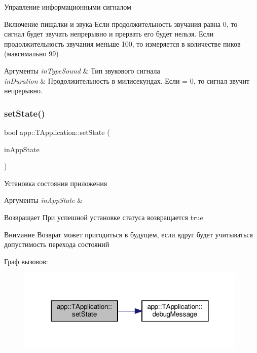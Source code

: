 Управление информационными сигналом 

Включение пищалки и звука Если продолжительность звучания равна 0, то сигнал будет звучать непрерывно и прервать его будет нельзя. Если продолжительность звучания меньше 100, то измеряется в количестве пиков (максимально 99) 
\begin{DoxyParams}{Аргументы}
{\em in\+Type\+Sound} & Тип звукового сигнала \\
\hline
{\em in\+Duration} & Продолжительность в милисекундах. Если = 0, то сигнал звучит непрерывно. \\
\hline
\end{DoxyParams}
\mbox{\label{classapp_1_1_t_application_a3df1835103a3ba338821c27ad05f9f8d}} 
\subsubsection{\texorpdfstring{set\+State()}{setState()}}
{\footnotesize\ttfamily bool app\+::\+T\+Application\+::set\+State (\begin{DoxyParamCaption}\item[{\hyperlink{namespaceapp_a290e8080c661e52c2f685fd4af148acf}{app\+::app\+State}}]{in\+App\+State }\end{DoxyParamCaption})}



Установка состояния приложения 


\begin{DoxyParams}{Аргументы}
{\em in\+App\+State} & \\
\hline
\end{DoxyParams}
\begin{DoxyReturn}{Возвращает}
При успешной установке статуса возвращается true 
\end{DoxyReturn}
\begin{DoxyAttention}{Внимание}
Возврат может пригодиться в будущем, если вдруг будет учитываться допустимость перехода состояний 
\end{DoxyAttention}
Граф вызовов\+:\nopagebreak
\begin{figure}[H]
\begin{center}
\leavevmode
\includegraphics[width=312pt]{classapp_1_1_t_application_a3df1835103a3ba338821c27ad05f9f8d_cgraph}
\end{center}
\end{figure}
\mbox{\label{classapp_1_1_t_application_ab44dd5aa2afe1d66b2588e908bfad4d0}} 
